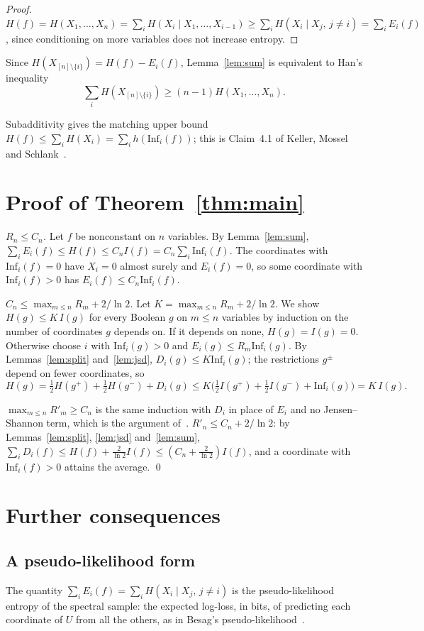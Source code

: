 \documentclass[11pt]{amsart}
\theoremstyle{remark}
\newcommand{\Inf}{\mathrm{Inf}}
\begin{document}
\begin{proof}
$H(f)=H(X_1,\dots,X_n)=\sum_i H(X_i\mid X_1,\dots,X_{i-1})\ge\sum_i H(X_i\mid X_j,\,j\ne i)=\sum_iE_i(f)$, since
conditioning on more variables does not increase entropy.
\end{proof}

Since $H(X_{[n]\setminus\{i\}})=H(f)-E_i(f)$, Lemma~\ref{lem:sum} is equivalent to Han's inequality~\cite{Han78}
\[
\textstyle\sum_iH(X_{[n]\setminus\{i\}})\ge(n-1)H(X_1,\dots,X_n).
\]

Subadditivity gives the matching upper bound $H(f)\le\sum_iH(X_i)=\sum_ih(\Inf_i(f))$; this is Claim~4.1 of Keller, Mossel and Schlank~\cite{KMS}.

\section{Proof of Theorem~\ref{thm:main}}\label{sec:proof}

\emph{$R_n\le C_n$.} Let $f$ be nonconstant on $n$ variables. By Lemma~\ref{lem:sum},
$\sum_iE_i(f)\le H(f)\le C_nI(f)=C_n\sum_i\Inf_i(f)$. The coordinates with $\Inf_i(f)=0$ have $X_i=0$ almost surely
and $E_i(f)=0$, so some coordinate with $\Inf_i(f)>0$ has $E_i(f)\le C_n\Inf_i(f)$.

\emph{$C_n\le\max_{m\le n}R_m+2/\ln2$.} Let $K=\max_{m\le n}R_m+2/\ln2$. We show $H(g)\le K\,I(g)$ for every Boolean
$g$ on $m\le n$ variables by induction on the number of coordinates $g$ depends on. If it depends on none,
$H(g)=I(g)=0$. Otherwise choose $i$ with $\Inf_i(g)>0$ and $E_i(g)\le R_m\Inf_i(g)$. By Lemmas~\ref{lem:split}
and~\ref{lem:jsd}, $D_i(g)\le K\Inf_i(g)$; the restrictions $g^{\pm}$ depend on fewer coordinates, so
\[
H(g)=\tfrac12H(g^+)+\tfrac12H(g^-)+D_i(g)\le K\bigl(\tfrac12I(g^+)+\tfrac12I(g^-)+\Inf_i(g)\bigr)=K\,I(g).
\]

\emph{$\max_{m\le n}R'_m\ge C_n$} is the same induction with $D_i$ in place of $E_i$ and no Jensen--Shannon term,
which is the argument of~\cite{GMP}. \emph{$R'_n\le C_n+2/\ln2$}: by Lemmas~\ref{lem:split}, \ref{lem:jsd}
and~\ref{lem:sum}, $\sum_iD_i(f)\le H(f)+\frac2{\ln2}I(f)\le(C_n+\frac2{\ln2})I(f)$, and a coordinate with
$\Inf_i(f)>0$ attains the average. \qed

\section{Further consequences}\label{sec:more}

\subsection*{A pseudo-likelihood form}
The quantity $\sum_iE_i(f)=\sum_i H(X_i\mid X_j,\,j\neq i)$ is the pseudo-likelihood entropy of the spectral sample:
the expected log-loss, in bits, of predicting each coordinate of $U$ from all the others, as in Besag's
pseudo-likelihood~\cite{Bes75}.
\end{document}
